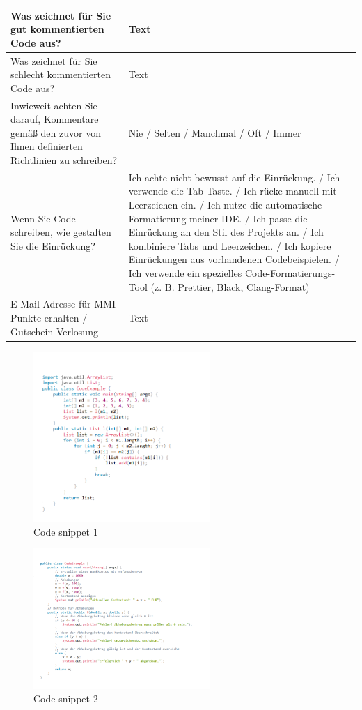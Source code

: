 \begin{table}[H]
{\begin{minipage}{\textwidth}
\begin{longtable}{|p{5cm}|p{9cm}|}
Was zeichnet für Sie gut kommentierten Code aus? & Text \\
\hline
Was zeichnet für Sie schlecht kommentierten Code aus? & Text \\
\hline
Inwieweit achten Sie darauf, Kommentare gemäß den zuvor von Ihnen definierten Richtlinien zu schreiben? & Nie / Selten / Manchmal / Oft / Immer \\
\hline
Wenn Sie Code schreiben, wie gestalten Sie die Einrückung? & Ich achte nicht bewusst auf die Einrückung. / Ich verwende die Tab-Taste. / Ich rücke manuell mit Leerzeichen ein. / Ich nutze die automatische Formatierung meiner IDE. / Ich passe die Einrückung an den Stil des Projekts an. / Ich kombiniere Tabs und Leerzeichen. / Ich kopiere Einrückungen aus vorhandenen Codebeispielen. / Ich verwende ein spezielles Code-Formatierungs-Tool (z. B. Prettier, Black, Clang-Format) \\
\hline
E-Mail-Adresse für MMI-Punkte erhalten / Gutschein-Verlosung & Text \\
\hline
\end{longtable}
\end{minipage}%
} 
\end{table}

\begin{figure}[H]
    \centering
    \includegraphics[width=0.6\textwidth]{figures/schnitt.png}
    \caption{Code snippet 1}
    \label{fig:appendix-example1}
\end{figure}

\begin{figure}[H]
    \centering
    \includegraphics[width=0.6\textwidth]{figures/konto.png}
    \caption{Code snippet 2}
    \label{fig:appendix-example2}
\end{figure}

